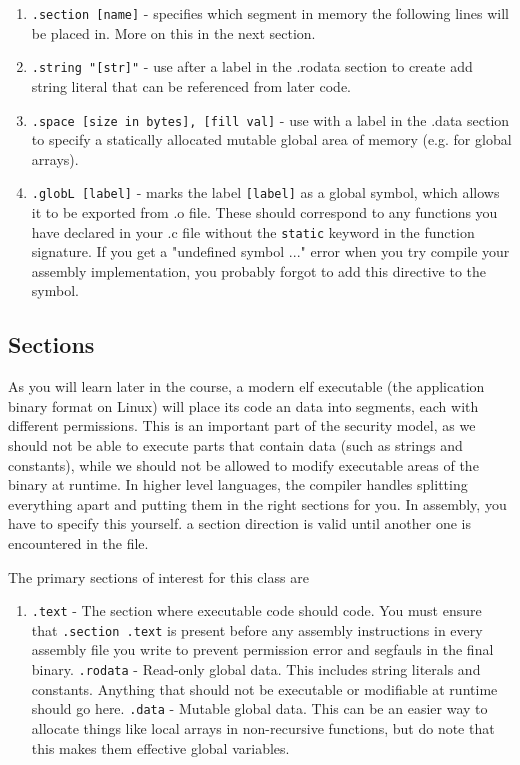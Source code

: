 \documentclass[11pt]{article}
\begin{document}
\begin{enumerate}
    \item \texttt{.section [name]} - specifies which segment in memory the following lines
        will be placed in. More on this in the next section.
    \item \texttt{.string "[str]"} - use after a label in the .rodata section to create add
        string literal that can be referenced from later code.
    \item \texttt{.space [size in bytes], [fill val]} - use with a label in the .data
        section to specify a statically allocated mutable global area of memory (e.g. for
        global arrays).
    \item \texttt{.globL [label]} - marks the label \texttt{[label]} as a global symbol,
        which allows it to be exported from .o file. These should correspond to any
        functions you have declared in your .c file without the \texttt{static} keyword in
        the function signature. If you get a "undefined symbol ..." error when you try
        compile your assembly implementation, you probably forgot to add this directive to
        the symbol.
\end{enumerate}

\subsection{Sections}

As you will learn later in the course, a modern elf executable (the application binary
format on Linux) will place its code an data into segments, each with different
permissions. This is an important part of the security model, as we should not be able to
execute parts that contain data (such as strings and constants), while we should not be
allowed to modify executable areas of the binary at runtime. In higher level languages,
the compiler handles splitting everything apart and putting them in the right sections for
you. In assembly, you have to specify this yourself. a section direction is valid until
another one is encountered in the file.

The primary sections of interest for this class are

\begin{enumerate}
    \item \texttt{.text} - The section where executable code should code. You must ensure
        that \texttt{.section .text} is present before any assembly instructions in every
        assembly file you write to prevent permission error and segfauls in the final
        binary.
        \texttt{.rodata} - Read-only global data. This includes string literals and constants.
        Anything that should not be executable or modifiable at runtime should go here.
        \texttt{.data} - Mutable global data. This can be an easier way to allocate things
        like local arrays in non-recursive functions, but do note that this makes them
        effective global variables.
\end{enumerate}
\end{document}
